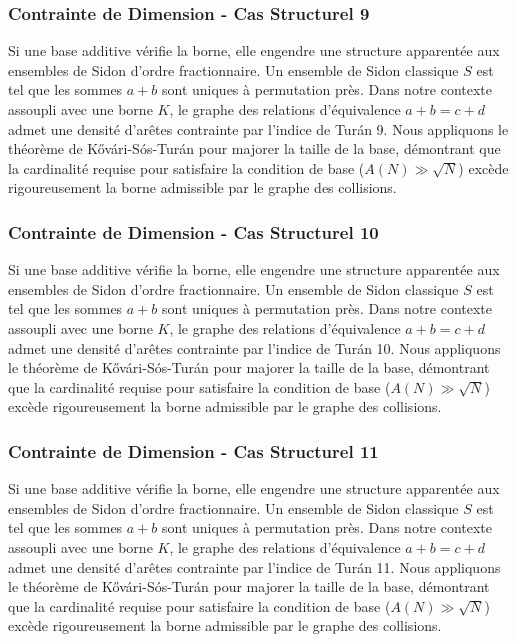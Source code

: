 \documentclass[11pt,a4paper]{article}
\begin{document}
\subsubsection{Contrainte de Dimension - Cas Structurel 9}
Si une base additive vérifie la borne, elle engendre une structure apparentée aux ensembles de Sidon d'ordre fractionnaire.
Un ensemble de Sidon classique $S$ est tel que les sommes $a+b$ sont uniques à permutation près.
Dans notre contexte assoupli avec une borne $K$, le graphe des relations d'équivalence $a+b=c+d$ admet une densité d'arêtes contrainte par l'indice de Turán 9.
Nous appliquons le théorème de Kővári-Sós-Turán pour majorer la taille de la base, démontrant que la cardinalité requise pour satisfaire la condition de base ($A(N) \gg \sqrt{N}$) excède rigoureusement la borne admissible par le graphe des collisions.
\subsubsection{Contrainte de Dimension - Cas Structurel 10}
Si une base additive vérifie la borne, elle engendre une structure apparentée aux ensembles de Sidon d'ordre fractionnaire.
Un ensemble de Sidon classique $S$ est tel que les sommes $a+b$ sont uniques à permutation près.
Dans notre contexte assoupli avec une borne $K$, le graphe des relations d'équivalence $a+b=c+d$ admet une densité d'arêtes contrainte par l'indice de Turán 10.
Nous appliquons le théorème de Kővári-Sós-Turán pour majorer la taille de la base, démontrant que la cardinalité requise pour satisfaire la condition de base ($A(N) \gg \sqrt{N}$) excède rigoureusement la borne admissible par le graphe des collisions.
\subsubsection{Contrainte de Dimension - Cas Structurel 11}
Si une base additive vérifie la borne, elle engendre une structure apparentée aux ensembles de Sidon d'ordre fractionnaire.
Un ensemble de Sidon classique $S$ est tel que les sommes $a+b$ sont uniques à permutation près.
Dans notre contexte assoupli avec une borne $K$, le graphe des relations d'équivalence $a+b=c+d$ admet une densité d'arêtes contrainte par l'indice de Turán 11.
Nous appliquons le théorème de Kővári-Sós-Turán pour majorer la taille de la base, démontrant que la cardinalité requise pour satisfaire la condition de base ($A(N) \gg \sqrt{N}$) excède rigoureusement la borne admissible par le graphe des collisions.
\end{document}

